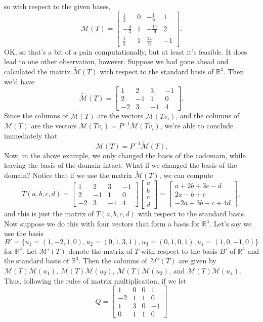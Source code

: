 \documentclass[12pt,letterpaper]{article}
\newcommand{\M}{\mathcal{M}}
\newcommand{\R}{\mathbb{R}}
\begin{document}
so with respect to the given bases,
\[
\M(T) = \begin{bmatrix}\frac{1}{3}&0&-\frac{1}{9}&1\\
-\frac{4}{3}&1&-\frac{11}{9}&2\\
\frac{1}{3}&1&\frac{14}{9}&-1
\end{bmatrix}.
\]
OK, so that's a bit of a pain computationally, but at least it's feasible. It does lead to one other observation, however. Suppose we had gone ahead and calculated the matrix $\tilde{\M}(T)$ with respect to the standard basis of $\R^3$. Then we'd have
\[
\tilde{\M}(T) = \begin{bmatrix}1&2&3&-1\\2&-1&1&0\\-2&3&-1&4\end{bmatrix}.
\]
Since the columns of $\tilde{\M}(T)$ are the vectors $\tilde{\M}(Tv_i)$, and the columns of $\M(T)$ are the vectors $\M(Tv_i) = P^{-1}\tilde{\M}(Tv_i)$, we're able to conclude immediately that
\[
\M(T) = P^{-1}\tilde{\M}(T).
\]
Now, in the above example, we only changed the basis of the codomain, while leaving the basis of the domain intact. What if we changed the basis of the domain? Notice that if we use the matrix $\tilde{\M}(T)$, we can compute
\[
T(a,b,c,d) = \begin{bmatrix}1&2&3&-1\\2&-1&1&0\\-2&3&-1&4\end{bmatrix}\begin{bmatrix}a\\b\\c\\d\end{bmatrix} = \begin{bmatrix}a+2b+3c-d\\2a-b+c\\-2a+3b-c+4d\end{bmatrix},
\]
and this is just the matrix of $T(a,b,c,d)$ with respect to the standard basis. Now suppose we do this with four vectors that form a basis for $\R^4$. Let's say we use the basis
\[
B' = \{u_1=(1,-2,1,0),u_2=(0,1,3,1), u_3=(0,1,0,1), u_4 = (1,0,-1,0)\}
\]
for $\R^4$. Let $\M'(T)$ denote the matrix of $T$ with respect to the basis $B'$ of $\R^4$ and the standard basis of $\R^3$. Then the columns of $\M'(T)$ are given by $\M(T)\M(u_1)$, $\M(T)\M(u_2)$, $\M(T)\M(u_3)$, and $\M(T)\M(u_4)$. Thus, following the rules of matrix multiplication, if we let
\[
Q = \begin{bmatrix}1&0&0&1\\-2&1&1&0\\1&3&0&-1\\0&1&1&0\end{bmatrix}
\]
\end{document}
